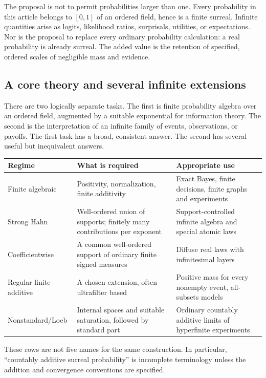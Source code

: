 \documentclass[11pt,a4paper]{article}
\numberwithin{equation}{section}
\theoremstyle{definition}
\theoremstyle{remark}
\begin{document}
The proposal is not to permit probabilities larger than one. Every
probability in this article belongs to $[0,1]$ of an ordered field, hence is a
finite surreal. Infinite quantities arise as logits, likelihood ratios,
surprisals, utilities, or expectations. Nor is the proposal to replace every
ordinary probability calculation: a real probability is already surreal.
The added value is the retention of specified, ordered scales of negligible
mass and evidence.

\subsection{A core theory and several infinite extensions}

There are two logically separate tasks. The first is finite probability
algebra over an ordered field, augmented by a suitable exponential for
information theory. The second is the interpretation of an infinite family
of events, observations, or payoffs. The first task has a broad, consistent
answer. The second has several useful but inequivalent answers.

\begin{center}
\small
\begin{tabularx}{\textwidth}{@{}>{\raggedright\arraybackslash}p{}>{\raggedright\arraybackslash}X>{\raggedright\arraybackslash}X@{}}
\toprule
Regime & What is required & Appropriate use\\
\midrule
Finite algebraic & Positivity, normalization, finite additivity & Exact Bayes,
finite decisions, finite graphs and experiments\\
Strong Hahn & Well-ordered union of supports; finitely many contributions per
exponent & Support-controlled infinite algebra and special atomic laws\\
Coefficientwise & A common well-ordered support of ordinary finite signed
measures & Diffuse real laws with infinitesimal layers\\
Regular finite-additive & A chosen extension, often ultrafilter based & Positive
mass for every nonempty event, all-subsets models\\
Nonstandard/Loeb & Internal spaces and suitable saturation, followed by
standard part & Ordinary countably additive limits of hyperfinite experiments\\
\bottomrule
\end{tabularx}
\end{center}

These rows are not five names for the same construction. In particular,
``countably additive surreal probability'' is incomplete terminology unless
the addition and convergence conventions are specified.
\end{document}
